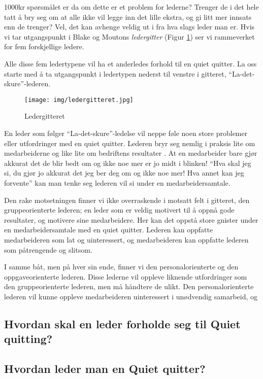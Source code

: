 \documentclass[a4paper, 12pt]{article}  %
\begin{document}
1000kr spørsmålet er da om dette er et problem for lederne? 
Trenger de i det hele tatt å bry seg om at alle ikke vil legge inn det lille ekstra, og gi litt mer innsats enn de trenger? 
Vel, det kan avhenge veldig ut i fra hva slags leder man er. 
Hvis vi tar utgangspunkt i Blake og Moutons \emph{ledergitter} (Figur \ref{fig:ledergitter}) ser vi rammeverket for fem forskjellige ledere.

Alle disse fem ledertypene vil ha et anderledes forhold til en quiet quitter. 
La oss starte med å ta utgangspunkt i ledertypen nederst til venstre i gitteret, ``La-det-skure''-lederen.

\begin{figure}[H]
  \centering
  \texttt{[image: img/ledergitteret.jpg]}
  \caption{Ledergitteret \parencite[63]{ledelse}}
  \label{fig:ledergitter}
\end{figure}

En leder som følger ``La-det-skure''-ledelse vil neppe føle noen store problemer eller utfordringer med en quiet quitter. 
Lederen bryr seg nemlig i praksis lite om medarbeiderne og like lite om bedriftens resultater \parencite{ledelse}. 
At en medarbeider bare gjør akkurat det de blir bedt om og ikke noe mer er jo midt i blinken! 
``Hva skal jeg si, du gjør jo akkurat det jeg ber deg om og ikke noe mer! Hva annet kan jeg forvente'' kan man tenke seg lederen vil si under en medarbeidersamtale.

Den rake motsetningen finner vi ikke overraskende i motsatt felt i gitteret, den gruppeorienterte lederen; 
en leder som er veldig motivert til å oppnå gode resultater, og motivere sine medarbeidere. Her kan det oppstå store gnister under en medarbeidersamtale med en quiet quitter. Lederen kan oppfatte medarbeideren som lat og uinteressert, og medarbeideren kan oppfatte lederen som påtrengende og slitsom.

I samme båt, men på hver sin ende, finner vi den personalorienterte og den oppgaveorienterte lederen. Disse lederne vil oppleve liknende utfordringer som den gruppeorienterte lederen, men må håndtere de ulikt. Den personalorienterte lederen vil kunne oppleve medarbeideren uinteressert i unødvendig samarbeid, og 

\subsection{Hvordan skal en leder forholde seg til Quiet quitting?}


\subsection{Hvordan leder man en Quiet quitter?}
\end{document}

